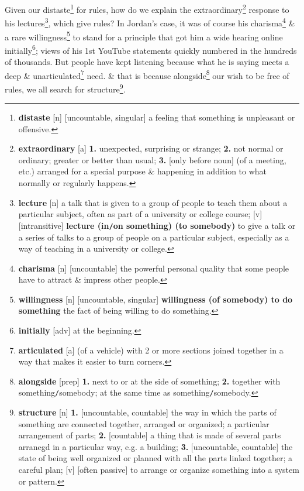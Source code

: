 \documentclass[oneside]{book}
\numberwithin{equation}{section}
\begin{document}
Given our distaste\footnote{\textbf{distaste} [n] [uncountable, singular] a feeling that something is unpleasant or offensive.} for rules, how do we explain the extraordinary\footnote{\textbf{extraordinary} [a] \textbf{1.} unexpected, surprising or strange; \textbf{2.} not normal or ordinary; greater or better than usual; \textbf{3.} [only before noun] (of a meeting, etc.) arranged for a special purpose \& happening in addition to what normally or regularly happens.} response to his lectures\footnote{\textbf{lecture} [n] a talk that is given to a group of people to teach them about a particular subject, often as part of a university or college course; [v] [intransitive] \textbf{lecture (in\texttt{/}on something) (to somebody)} to give a talk or a series of talks to a group of people on a particular subject, especially as a way of teaching in a university or college.}, which give rules? In Jordan's case, it was of course his charisma\footnote{\textbf{charisma} [n] [uncountable] the powerful personal quality that some people have to attract \& impress other people.} \& a rare willingness\footnote{\textbf{willingness} [n] [uncountable, singular] \textbf{willingness (of somebody) to do something} the fact of being willing to do something.} to stand for a principle that got him a wide hearing online initially\footnote{\textbf{initially} [adv] at the beginning.}; views of his 1st YouTube statements quickly numbered in the hundreds of thousands. But people have kept listening because what he is saying meets a deep \& unarticulated\footnote{\textbf{articulated} [a] (of a vehicle) with 2 or more sections joined together in a way that makes it easier to turn corners.} need. \& that is because alongside\footnote{\textbf{alongside} [prep] \textbf{1.} next to or at the side of something; \textbf{2.} together with something\texttt{/}somebody; at the same time as something\texttt{/}somebody.} our wish to be free of rules, we all search for structure\footnote{\textbf{structure} [n] \textbf{1.} [uncountable, countable] the way in which the parts of something are connected together, arranged or organized; a particular arrangement of parts; \textbf{2.} [countable] a thing that is made of several parts arranegd in a particular way, e.g. a building; \textbf{3.} [uncountable, countable] the state of being well organized or planned with all the parts linked together; a careful plan; [v] [often passive] to arrange or organize something into a system or pattern.}.
\end{document}

